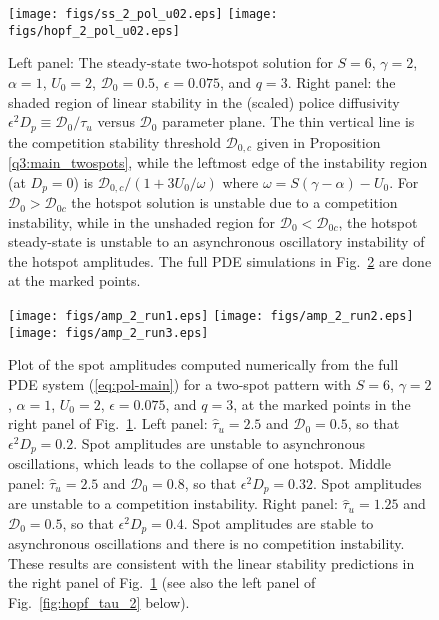 \documentclass{article}%
\begin{document}
\begin{figure}[htbp]
\centering
\texttt{[image: figs/ss\_2\_pol\_u02.eps]}
\texttt{[image: figs/hopf\_2\_pol\_u02.eps]}
\caption{\label{fig:hopf_pol_intro} Left panel: The steady-state
  two-hotspot solution for $S=6$, $\gamma=2$, $\alpha=1$, $U_0=2$,
  ${\mathcal D}_0=0.5$, $\epsilon=0.075$, and $q=3$. Right panel: the
  shaded region of linear stability in the (scaled) police diffusivity
  $\epsilon^{2}D_p\equiv {{\mathcal D}_0/\tau_u}$ versus ${\mathcal
    D}_0$ parameter plane. The thin vertical line is the competition
  stability threshold ${\mathcal D}_{0,c}$ given in Proposition
  \ref{q3:main_twospots}, while the leftmost edge of the instability
  region (at $D_p=0$) is ${{\mathcal D}_{0,c}/(1+{3U_0/\omega})}$
  where $\omega=S(\gamma-\alpha)-U_0$.  For ${\mathcal D}_0>{\mathcal
    D}_{0c}$ the hotspot solution is unstable due to a competition
  instability, while in the unshaded region for ${\mathcal
    D}_0<{\mathcal D}_{0c}$, the hotspot steady-state is unstable to
  an asynchronous oscillatory instability of the hotspot amplitudes. The full
  PDE simulations in Fig.~\ref{fig:valid_2spot_q3} are done at the marked 
  points.}
\end{figure}

%
\begin{figure}[htbp]
\centering
\texttt{[image: figs/amp\_2\_run1.eps]}
\texttt{[image: figs/amp\_2\_run2.eps]}
\texttt{[image: figs/amp\_2\_run3.eps]}
\caption{\label{fig:valid_2spot_q3} Plot of the spot amplitudes
  computed numerically from the full PDE system (\ref{eq:pol-main})
  for a two-spot pattern with $S=6$, $\gamma=2$, $\alpha=1$, $U_0=2$,
  $\epsilon=0.075$, and $q=3$, at the marked points in the right panel of
  Fig.~\ref{fig:hopf_pol_intro}.  Left panel: $\hat{\tau}_u=2.5$ and
  ${\mathcal D}_0=0.5$, so that $\epsilon^2 D_p=0.2$. Spot amplitudes
  are unstable to asynchronous oscillations, which leads to the
  collapse of one hotspot.  Middle panel: $\hat{\tau}_u=2.5$ and
  ${\mathcal D}_0=0.8$, so that $\epsilon^2 D_p=0.32$. Spot amplitudes
  are unstable to a competition instability. Right panel:
  $\hat{\tau}_u=1.25$ and ${\mathcal D}_0=0.5$, so that
  $\epsilon^2D_p=0.4$. Spot amplitudes are stable to asynchronous
  oscillations and there is no competition instability.  These results
  are consistent with the linear stability predictions in the right
  panel of Fig.~\ref{fig:hopf_pol_intro} (see also the left panel of
  Fig.~\ref{fig:hopf_tau_2} below).}
\end{figure}
\end{document}
